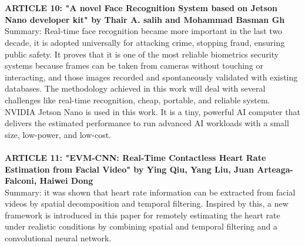 \\ \\
\textbf{ARTICLE 10: "A novel Face Recognition System based on Jetson Nano developer kit" by Thair A. salih and Mohammad Basman Gh
}\\
Summary:
Real-time face recognition became more important in the last two decade, it
is adopted universally for attacking crime, stopping fraud, ensuring public safety.  It
proves that it is one of the most reliable biometrics security systems because frames
can be taken from cameras without touching or interacting, and those images
recorded and spontaneously validated with existing databases. The methodology
achieved in this work will deal with several challenges like real-time recognition,
cheap, portable, and reliable system. NVIDIA Jetson Nano is used in this work. It is
a tiny, powerful AI computer that delivers the estimated performance to run
advanced AI workloads with a small size, low-power, and low-cost.
\\ \\
\textbf{ARTICLE 11: "EVM-CNN: Real-Time Contactless Heart Rate
Estimation from Facial Video" by
Ying Qiu, Yang Liu, Juan Arteaga-Falconi, Haiwei Dong
}\\
Summary:
 it was
shown that heart rate information can be extracted from facial
videos by spatial decomposition and temporal filtering. Inspired
by this, a new framework is introduced in this paper for remotely
estimating the heart rate under realistic conditions by combining
spatial and temporal filtering and a convolutional neural network.
 